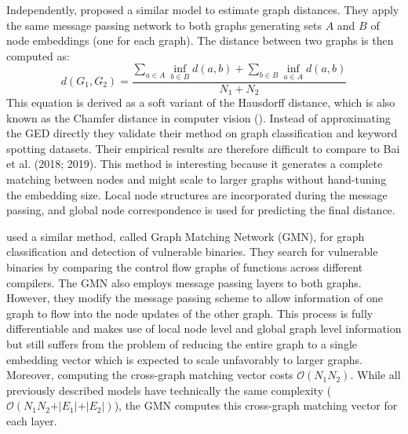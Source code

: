 Independently, \cite{riba2018} proposed a similar model to estimate graph distances. They apply the same message passing network to both graphs generating sets $A$ and $B$ of node embeddings (one for each graph). The distance between two graphs is then computed as:
\begin{equation}
     d(G_{1}, G_{2}) = \frac{\sum_{a \in A} \inf_{b \in B} d(a, b) + \sum_{b \in B} \inf_{a \in A} d(a, b)}{N_1 + N_2}
\end{equation}
This equation is derived as a soft variant of the Hausdorff distance, which is also known as the Chamfer distance in computer vision (\citealp{chamfer1977}). Instead of approximating the GED directly they validate their method on graph classification and keyword spotting datasets. Their empirical results are therefore difficult to compare to Bai et al. (2018; 2019). This method is interesting because it generates a complete matching between nodes and might scale to larger graphs without hand-tuning the embedding size. Local node structures are incorporated during the message passing, and global node correspondence is used for predicting the final distance.

\cite{li2019} used a similar method, called Graph Matching Network (GMN), for graph classification and detection of vulnerable binaries. They search for vulnerable binaries by comparing the control flow graphs of functions across different compilers. The GMN also employs message passing layers to both graphs. However, they modify the message passing scheme to allow information of one graph to flow into the node updates of the other graph. %
This process is fully differentiable and makes use of local node level and global graph level information but still suffers from the problem of reducing the entire graph to a single embedding vector which is expected to scale unfavorably to larger graphs. Moreover, computing the cross-graph matching vector costs $\mathcal{O}(N_1 N_2)$. While all previously described models have technically the same complexity ($\mathcal{O}(N_1 N_2 + \vert E_1 \vert + \vert E_2 \vert)$), the GMN computes this cross-graph matching vector for each layer.


